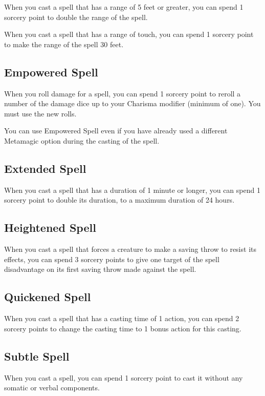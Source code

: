 When you cast a spell that has a range of 5 feet or greater, you can spend 1 sorcery point to double the range of the spell.

When you cast a spell that has a range of touch, you can spend 1 sorcery point to make the range of the spell 30 feet.

\subsection{Empowered Spell}

When you roll damage for a spell, you can spend 1 sorcery point to reroll a number of the damage dice up to your Charisma modifier (minimum of one). You must use the new rolls.

You can use Empowered Spell even if you have already used a different Metamagic option during the casting of the spell.

\subsection{Extended Spell}

When you cast a spell that has a duration of 1 minute or longer, you can spend 1 sorcery point to double its duration, to a maximum duration of 24 hours.

\subsection{Heightened Spell}

When you cast a spell that forces a creature to make a saving throw to resist its effects, you can spend 3 sorcery points to give one target of the spell disadvantage on its first saving throw made against the spell.

\subsection{Quickened Spell}

When you cast a spell that has a casting time of 1 action, you can spend 2 sorcery points to change the casting time to 1 bonus action for this casting.

\subsection{Subtle Spell}

When you cast a spell, you can spend 1 sorcery point to cast it without any somatic or verbal components.

